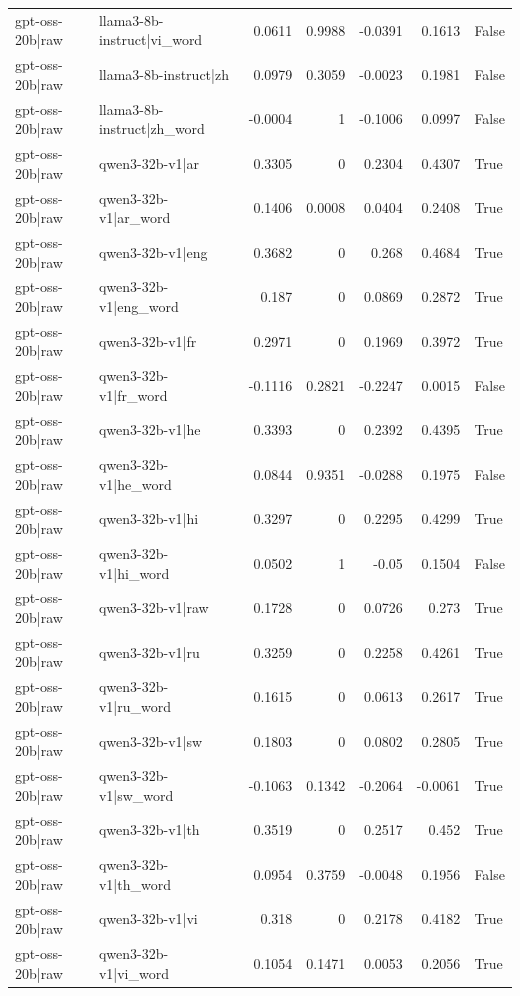 \begin{table}
\begin{tabular}{l l r r r r l}
gpt-oss-20b|raw & llama3-8b-instruct|vi_word & 0.0611 & 0.9988 & -0.0391 & 0.1613 & False \\
gpt-oss-20b|raw & llama3-8b-instruct|zh & 0.0979 & 0.3059 & -0.0023 & 0.1981 & False \\
gpt-oss-20b|raw & llama3-8b-instruct|zh_word & -0.0004 & 1 & -0.1006 & 0.0997 & False \\
gpt-oss-20b|raw & qwen3-32b-v1|ar & 0.3305 & 0 & 0.2304 & 0.4307 & True \\
gpt-oss-20b|raw & qwen3-32b-v1|ar_word & 0.1406 & 0.0008 & 0.0404 & 0.2408 & True \\
gpt-oss-20b|raw & qwen3-32b-v1|eng & 0.3682 & 0 & 0.268 & 0.4684 & True \\
gpt-oss-20b|raw & qwen3-32b-v1|eng_word & 0.187 & 0 & 0.0869 & 0.2872 & True \\
gpt-oss-20b|raw & qwen3-32b-v1|fr & 0.2971 & 0 & 0.1969 & 0.3972 & True \\
gpt-oss-20b|raw & qwen3-32b-v1|fr_word & -0.1116 & 0.2821 & -0.2247 & 0.0015 & False \\
gpt-oss-20b|raw & qwen3-32b-v1|he & 0.3393 & 0 & 0.2392 & 0.4395 & True \\
gpt-oss-20b|raw & qwen3-32b-v1|he_word & 0.0844 & 0.9351 & -0.0288 & 0.1975 & False \\
gpt-oss-20b|raw & qwen3-32b-v1|hi & 0.3297 & 0 & 0.2295 & 0.4299 & True \\
gpt-oss-20b|raw & qwen3-32b-v1|hi_word & 0.0502 & 1 & -0.05 & 0.1504 & False \\
gpt-oss-20b|raw & qwen3-32b-v1|raw & 0.1728 & 0 & 0.0726 & 0.273 & True \\
gpt-oss-20b|raw & qwen3-32b-v1|ru & 0.3259 & 0 & 0.2258 & 0.4261 & True \\
gpt-oss-20b|raw & qwen3-32b-v1|ru_word & 0.1615 & 0 & 0.0613 & 0.2617 & True \\
gpt-oss-20b|raw & qwen3-32b-v1|sw & 0.1803 & 0 & 0.0802 & 0.2805 & True \\
gpt-oss-20b|raw & qwen3-32b-v1|sw_word & -0.1063 & 0.1342 & -0.2064 & -0.0061 & True \\
gpt-oss-20b|raw & qwen3-32b-v1|th & 0.3519 & 0 & 0.2517 & 0.452 & True \\
gpt-oss-20b|raw & qwen3-32b-v1|th_word & 0.0954 & 0.3759 & -0.0048 & 0.1956 & False \\
gpt-oss-20b|raw & qwen3-32b-v1|vi & 0.318 & 0 & 0.2178 & 0.4182 & True \\
gpt-oss-20b|raw & qwen3-32b-v1|vi_word & 0.1054 & 0.1471 & 0.0053 & 0.2056 & True \\

\end{tabular}
\end{table}
